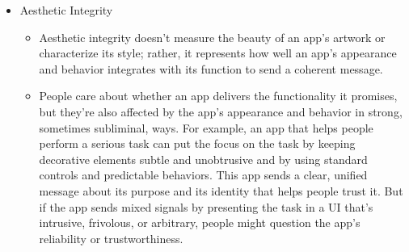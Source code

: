 \begin{itemize}
\item Aesthetic Integrity
	\begin{itemize}
	\item Aesthetic integrity doesn't measure the beauty of an app's artwork or characterize its style; rather, it represents how well an app's appearance and behavior integrates with its function to send a coherent message. 
	\item People care about whether an app delivers the functionality it promises, but they're also affected by the app's appearance and behavior in strong, sometimes subliminal, ways. For example, an app that helps people perform a serious task can put the focus on the task by keeping decorative elements subtle and unobtrusive and by using standard controls and predictable behaviors. This app sends a clear, unified message about its purpose and its identity that helps people trust it. But if the app sends mixed signals by presenting the task in a UI that's intrusive, frivolous, or arbitrary, people might question the app's reliability or trustworthiness.


\end{itemize}
\end{itemize}

